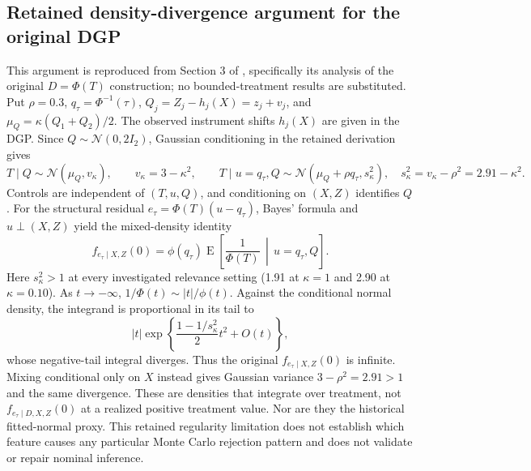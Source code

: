 \subsection{Retained density-divergence argument for the original DGP}
\label{app:density-divergence}
This argument is reproduced from Section 3 of , specifically its analysis of the original $D=\Phi(T)$ construction; no bounded-treatment results are substituted. Put $\rho=0.3$, $q_\tau=\Phi^{-1}(\tau)$, $Q_j=Z_j-h_j(X)=z_j+v_j$, and $\mu_Q=\kappa(Q_1+Q_2)/2$. The observed instrument shifts $h_j(X)$ are given in the DGP. Since $Q\sim\mathcal N(0,2I_2)$, Gaussian conditioning in the retained derivation gives
\[
 T\mid Q\sim\mathcal N(\mu_Q,v_\kappa),\qquad v_\kappa=3-\kappa^2,
 \qquad
 T\mid u=q_\tau,Q\sim\mathcal N(\mu_Q+\rho q_\tau,s_\kappa^2),\quad
 s_\kappa^2=v_\kappa-\rho^2=2.91-\kappa^2.
\]
Controls are independent of $(T,u,Q)$, and conditioning on $(X,Z)$ identifies $Q$. For the structural residual $e_\tau=\Phi(T)(u-q_\tau)$, Bayes' formula and $u\perp(X,Z)$ yield the mixed-density identity
\begin{equation}
 f_{e_\tau\mid X,Z}(0)
 =\phi(q_\tau)\operatorname E\!\left[\frac{1}{\Phi(T)}\,\middle|\,u=q_\tau,Q\right].
 \label{eq:mixed-density-divergence}
\end{equation}
Here $s_\kappa^2>1$ at every investigated relevance setting (1.91 at $\kappa=1$ and 2.90 at $\kappa=0.10$). As $t\to-\infty$, $1/\Phi(t)\sim |t|/\phi(t)$. Against the conditional normal density, the integrand is proportional in its tail to
\[
 |t|\exp\!\left\{\frac{1-1/s_\kappa^2}{2}t^2+O(t)\right\},
\]
whose negative-tail integral diverges. Thus the original $f_{e_\tau\mid X,Z}(0)$ is infinite. Mixing conditional only on $X$ instead gives Gaussian variance $3-\rho^2=2.91>1$ and the same divergence. These are densities that integrate over treatment, not $f_{e_\tau\mid D,X,Z}(0)$ at a realized positive treatment value. Nor are they the historical fitted-normal proxy. This retained regularity limitation does not establish which feature causes any particular Monte Carlo rejection pattern and does not validate or repair nominal inference.

